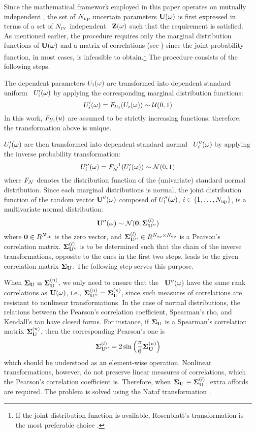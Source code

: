 Since the mathematical framework employed in this paper operates on mutually independent \rvs, the set of ${N_\text{up}}$ uncertain parameters $\mathbf{U}(\omega)$ is first expressed in terms of a set of ${N_\text{rv}}$ independent \rvs\ $\mathbf{Z}(\omega)$ such that the requirement is satisfied. As mentioned earlier, the procedure requires only the marginal distribution functions of $\mathbf{U}(\omega)$ and a matrix of correlations (see ) since the joint probability function, in most cases, is infeasible to obtain.\footnote{If the joint distribution function is available, Rosenblatt's transformation is the most preferable choice \cite{rosenblatt1952}.} The procedure consists of the following steps.

 The dependent parameters $U_i(\omega)$ are transformed into dependent standard uniform \rvs\ $U'_i(\omega)$ by applying the corresponding marginal distribution functions:
\begin{equation} \elabel{dependent-uniform}
  \U'_i(\o) = \CDF_{\U_i}(\U_i(\o)) \sim \uniform(0, 1)
\end{equation}
In this work, $F_{U_i}(u)$ are assumed to be strictly increasing functions; therefore, the transformation above is unique.

 $U'_i(\omega)$ are then transformed into dependent standard normal \rvs\ $U''_i(\omega)$ by applying the inverse probability transformation:
\begin{equation} \elabel{dependent-normal}
  \U''_i(\o) = \CDF^{-1}_\normal(\U'_i(\o)) \sim \normal(0, 1)
\end{equation}
where $F_{\mathcal{N}}$ denotes the distribution function of the (univariate) standard normal distribution. Since each marginal distributions is normal, the joint distribution function of the random vector $\mathbf{U}''(\omega)$ composed of $U''_i(\omega)$, $i \in \{ 1, \dots, {N_\text{up}} \}$, is a multivariate normal distribution:
\[
  \mathbf{U}''(\omega) \sim \mathcal{N}(\mathbf{0}, \mathbf{\Sigma}^{(l)}_{\mathbf{U}''})
\]
where $\mathbf{0} \in R^{N_\text{up}}$ is the zero vector, and $\mathbf{\Sigma}^{(l)}_{\mathbf{U}''} \in R^{{N_\text{up}} \times {N_\text{up}}}$ is a Pearson's correlation matrix. $\mathbf{\Sigma}^{(l)}_{\mathbf{U}''}$ is to be determined such that the chain of the inverse transformations, opposite to the ones in the first two steps, leads to the given correlation matrix $\mathbf{\Sigma}_{\mathbf{U}}$. The following step serves this purpose.

 When $\mathbf{\Sigma}_{\mathbf{U}} \equiv \mathbf{\Sigma}^{(n)}_{\mathbf{U}}$, we only need to ensure that the \rvs\ $\mathbf{U}''(\omega)$ have the same rank correlations as $\mathbf{U}(\omega)$, i.e., $\mathbf{\Sigma}^{(n)}_{\mathbf{U}''} = \mathbf{\Sigma}^{(n)}_{\mathbf{U}}$, since such measures of correlations are resistant to nonlinear transformations. In the case of normal distributions, the relations between the Pearson's correlation coefficient, Spearman's rho, and Kendall's tau have closed forms. For instance, if $\mathbf{\Sigma}_{\mathbf{U}}$ is a Spearman's correlation matrix $\mathbf{\Sigma}^{(n)}_{\mathbf{U}}$, then the corresponding Pearson's one is
\[
  \mathbf{\Sigma}^{(l)}_{\mathbf{U}''} = 2 \sin \left( \frac{\pi}{6} \mathbf{\Sigma}^{(n)}_{\mathbf{U}} \right)
\]
which should be understood as an element-wise operation. Nonlinear transformations, however, do not preserve linear measures of correlations, which the Pearson's correlation coefficient is. Therefore, when $\mathbf{\Sigma}_{\mathbf{U}} \equiv \mathbf{\Sigma}^{(l)}_{\mathbf{U}}$, extra affords are required. The problem is solved using the Nataf transformation \cite{li2008}.

